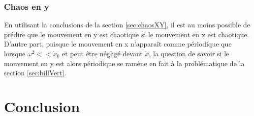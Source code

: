 \documentclass[a4paper]{report}
\begin{document}
\subsection{Chaos en y}
En utilisant la conclusions de la section \ref{sec:chaosXY}, il est au moins possible de prédire que le mouvement en y est chaotique si le mouvement en x est chaotique. D'autre part, puisque le mouvement en x n'apparaît comme périodique que lorsque \(\omega ^2 << \dot{x}_0 \) et peut être négligé devant \( \dot{x} \), la question de savoir si le mouvement en y est alors périodique se ramène en fait à la problématique de la section \ref{sec:billVert}.


\chapter{Conclusion}


\end{document}
